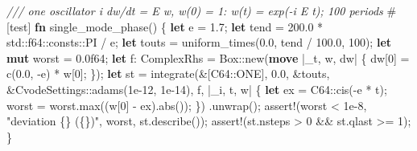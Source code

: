 \documentclass[
  10pt,
]{article}
\newenvironment{Shaded}{}{}
\newcommand{\AttributeTok}[1]{\textcolor[rgb]{0.49,0.56,0.16}{#1}}
\newcommand{\CommentTok}[1]{\textcolor[rgb]{0.38,0.63,0.69}{\textit{#1}}}
\newcommand{\DataTypeTok}[1]{\textcolor[rgb]{0.56,0.13,0.00}{#1}}
\newcommand{\DecValTok}[1]{\textcolor[rgb]{0.25,0.63,0.44}{#1}}
\newcommand{\KeywordTok}[1]{\textcolor[rgb]{0.00,0.44,0.13}{\textbf{#1}}}
\newcommand{\NormalTok}[1]{#1}
\newcommand{\OperatorTok}[1]{\textcolor[rgb]{0.40,0.40,0.40}{#1}}
\newcommand{\PreprocessorTok}[1]{\textcolor[rgb]{0.74,0.48,0.00}{#1}}
\newcommand{\StringTok}[1]{\textcolor[rgb]{0.25,0.44,0.63}{#1}}
\begin{document}
\begin{Shaded}
\begin{Highlighting}[]
    \CommentTok{/// one oscillator i dw/dt = E w, w(0) = 1: w(t) = exp({-}i E t); 100 periods}
    \AttributeTok{\#[}\NormalTok{test}\AttributeTok{]}
    \KeywordTok{fn}\NormalTok{ single\_mode\_phase() }\OperatorTok{\{}
        \KeywordTok{let}\NormalTok{ e }\OperatorTok{=} \DecValTok{1.7}\OperatorTok{;}
        \KeywordTok{let}\NormalTok{ tend }\OperatorTok{=} \DecValTok{200.0} \OperatorTok{*} \PreprocessorTok{std::}\DataTypeTok{f64}\PreprocessorTok{::consts::}\NormalTok{PI }\OperatorTok{/}\NormalTok{ e}\OperatorTok{;}
        \KeywordTok{let}\NormalTok{ touts }\OperatorTok{=}\NormalTok{ uniform\_times(}\DecValTok{0.0}\OperatorTok{,}\NormalTok{ tend }\OperatorTok{/} \DecValTok{100.0}\OperatorTok{,} \DecValTok{100}\NormalTok{)}\OperatorTok{;}
        \KeywordTok{let} \KeywordTok{mut}\NormalTok{ worst }\OperatorTok{=} \DecValTok{0.0f64}\OperatorTok{;}
        \KeywordTok{let}\NormalTok{ f}\OperatorTok{:}\NormalTok{ ComplexRhs }\OperatorTok{=} \DataTypeTok{Box}\PreprocessorTok{::}\NormalTok{new(}\KeywordTok{move} \OperatorTok{|}\NormalTok{\_t}\OperatorTok{,}\NormalTok{ w}\OperatorTok{,}\NormalTok{ dw}\OperatorTok{|} \OperatorTok{\{}
\NormalTok{            dw[}\DecValTok{0}\NormalTok{] }\OperatorTok{=}\NormalTok{ c(}\DecValTok{0.0}\OperatorTok{,} \OperatorTok{{-}}\NormalTok{e) }\OperatorTok{*}\NormalTok{ w[}\DecValTok{0}\NormalTok{]}\OperatorTok{;}
        \OperatorTok{\}}\NormalTok{)}\OperatorTok{;}
        \KeywordTok{let}\NormalTok{ st }\OperatorTok{=}\NormalTok{ integrate(}\OperatorTok{\&}\NormalTok{[}\PreprocessorTok{C64::}\NormalTok{ONE]}\OperatorTok{,} \DecValTok{0.0}\OperatorTok{,} \OperatorTok{\&}\NormalTok{touts}\OperatorTok{,} \OperatorTok{\&}\PreprocessorTok{CvodeSettings::}\NormalTok{adams(}\DecValTok{1e{-}12}\OperatorTok{,} \DecValTok{1e{-}14}\NormalTok{)}\OperatorTok{,}\NormalTok{ f}\OperatorTok{,} \OperatorTok{|}\NormalTok{\_i}\OperatorTok{,}\NormalTok{ t}\OperatorTok{,}\NormalTok{ w}\OperatorTok{|} \OperatorTok{\{}
            \KeywordTok{let}\NormalTok{ ex }\OperatorTok{=} \PreprocessorTok{C64::}\NormalTok{cis(}\OperatorTok{{-}}\NormalTok{e }\OperatorTok{*}\NormalTok{ t)}\OperatorTok{;}
\NormalTok{            worst }\OperatorTok{=}\NormalTok{ worst}\OperatorTok{.}\NormalTok{max((w[}\DecValTok{0}\NormalTok{] }\OperatorTok{{-}}\NormalTok{ ex)}\OperatorTok{.}\NormalTok{abs())}\OperatorTok{;}
        \OperatorTok{\}}\NormalTok{)}
        \OperatorTok{.}\NormalTok{unwrap()}\OperatorTok{;}
        \PreprocessorTok{assert!}\NormalTok{(worst }\OperatorTok{\textless{}} \DecValTok{1e{-}8}\OperatorTok{,} \StringTok{"deviation \{\} (\{\})"}\OperatorTok{,}\NormalTok{ worst}\OperatorTok{,}\NormalTok{ st}\OperatorTok{.}\NormalTok{describe())}\OperatorTok{;}
        \PreprocessorTok{assert!}\NormalTok{(st}\OperatorTok{.}\NormalTok{nsteps }\OperatorTok{\textgreater{}} \DecValTok{0} \OperatorTok{\&\&}\NormalTok{ st}\OperatorTok{.}\NormalTok{qlast }\OperatorTok{\textgreater{}=} \DecValTok{1}\NormalTok{)}\OperatorTok{;}
    \OperatorTok{\}}


\end{Highlighting}
\end{Shaded}
\end{document}
